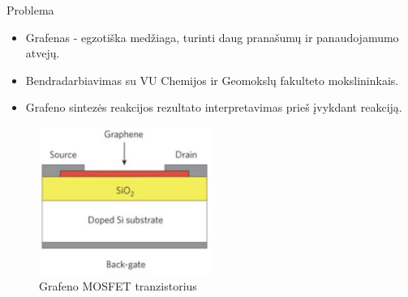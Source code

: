 \begin{frame}[c]{Problema}    
    \begin{minipage}{0.49\textwidth}
        \begin{itemize}
            \item  Grafenas - egzotiška medžiaga, turinti daug pranašumų ir panaudojamumo atvejų.
            \item Bendradarbiavimas su VU Chemijos ir Geomokslų fakulteto mokslininkais.
            \item Grafeno sintezės reakcijos rezultato interpretavimas  prieš įvykdant reakciją.
        \end{itemize}
    \end{minipage}
    \begin{minipage}{0.49\textwidth}
        \begin{figure}
            \centering
            \includegraphics[width=0.5\textwidth]{img/Graphene_MOSFET.png}
            \caption{Grafeno MOSFET tranzistorius \cite{GrapheneMOSFET}}
            \label{fig:graphene_mosfet}
        \end{figure}
    \end{minipage}
\end{frame}